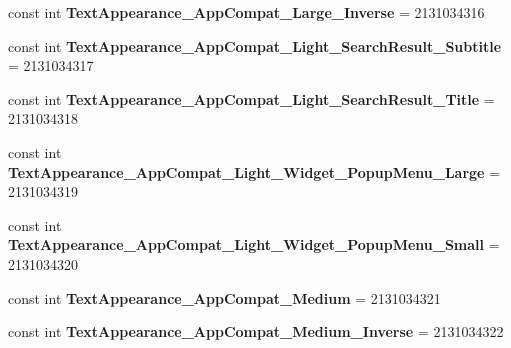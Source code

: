 \begin{DoxyCompactItemize}
\item 
\hypertarget{classClient_1_1Droid_1_1Resource_1_1Style_a7e6a18837392c9c26c58c8da84758551}{}const int {\bfseries Text\+Appearance\+\_\+\+App\+Compat\+\_\+\+Large\+\_\+\+Inverse} = 2131034316\label{classClient_1_1Droid_1_1Resource_1_1Style_a7e6a18837392c9c26c58c8da84758551}

\item 
\hypertarget{classClient_1_1Droid_1_1Resource_1_1Style_a82cb9e68b89a3a10e999fe5d53428dba}{}const int {\bfseries Text\+Appearance\+\_\+\+App\+Compat\+\_\+\+Light\+\_\+\+Search\+Result\+\_\+\+Subtitle} = 2131034317\label{classClient_1_1Droid_1_1Resource_1_1Style_a82cb9e68b89a3a10e999fe5d53428dba}

\item 
\hypertarget{classClient_1_1Droid_1_1Resource_1_1Style_abcfe8afe650dfbe04cd89b05b8a0a6f1}{}const int {\bfseries Text\+Appearance\+\_\+\+App\+Compat\+\_\+\+Light\+\_\+\+Search\+Result\+\_\+\+Title} = 2131034318\label{classClient_1_1Droid_1_1Resource_1_1Style_abcfe8afe650dfbe04cd89b05b8a0a6f1}

\item 
\hypertarget{classClient_1_1Droid_1_1Resource_1_1Style_a6cd28d8d683357b4fcd54b70c2a0f8ec}{}const int {\bfseries Text\+Appearance\+\_\+\+App\+Compat\+\_\+\+Light\+\_\+\+Widget\+\_\+\+Popup\+Menu\+\_\+\+Large} = 2131034319\label{classClient_1_1Droid_1_1Resource_1_1Style_a6cd28d8d683357b4fcd54b70c2a0f8ec}

\item 
\hypertarget{classClient_1_1Droid_1_1Resource_1_1Style_a84bb780b9825777c3c7a31f8bd621c09}{}const int {\bfseries Text\+Appearance\+\_\+\+App\+Compat\+\_\+\+Light\+\_\+\+Widget\+\_\+\+Popup\+Menu\+\_\+\+Small} = 2131034320\label{classClient_1_1Droid_1_1Resource_1_1Style_a84bb780b9825777c3c7a31f8bd621c09}

\item 
\hypertarget{classClient_1_1Droid_1_1Resource_1_1Style_ab57cdddc00c292af094ac476ee5f95a1}{}const int {\bfseries Text\+Appearance\+\_\+\+App\+Compat\+\_\+\+Medium} = 2131034321\label{classClient_1_1Droid_1_1Resource_1_1Style_ab57cdddc00c292af094ac476ee5f95a1}

\item 
\hypertarget{classClient_1_1Droid_1_1Resource_1_1Style_a277b69c5f7b09b8cda33111f1c573227}{}const int {\bfseries Text\+Appearance\+\_\+\+App\+Compat\+\_\+\+Medium\+\_\+\+Inverse} = 2131034322\label{classClient_1_1Droid_1_1Resource_1_1Style_a277b69c5f7b09b8cda33111f1c573227}


\end{DoxyCompactItemize}

